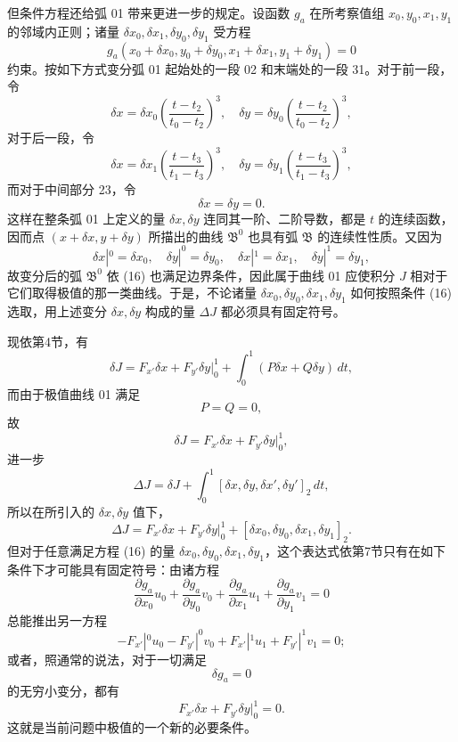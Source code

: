 \documentclass[11pt,a4paper,leqno]{article}
\begin{document}
但条件方程还给弧 01 带来更进一步的规定。设函数 $g_a$ 在所考察值组 $x_0,y_0,x_1,y_1$ 的邻域内正则；诸量 $\delta x_0,\delta x_1,\delta y_0,\delta y_1$ 受方程
\begin{equation}\tag{16}
g_a(x_0+\delta x_0,y_0+\delta y_0,x_1+\delta x_1,y_1+\delta y_1)=0
\end{equation}
约束。按如下方式变分弧 01 起始处的一段 02 和末端处的一段 31。对于前一段，令
\[
\delta x=\delta x_0\left(\frac{t-t_2}{t_0-t_2}\right)^3,
\quad
\delta y=\delta y_0\left(\frac{t-t_2}{t_0-t_2}\right)^3,
\]
对于后一段，令
\[
\delta x=\delta x_1\left(\frac{t-t_3}{t_1-t_3}\right)^3,
\quad
\delta y=\delta y_1\left(\frac{t-t_3}{t_1-t_3}\right)^3,
\]
而对于中间部分 23，令
\[
\delta x=\delta y=0.
\]
这样在整条弧 01 上定义的量 $\delta x,\delta y$ 连同其一阶、二阶导数，都是 $t$ 的连续函数，因而点 $(x+\delta x,y+\delta y)$ 所描出的曲线 $\mathfrak{B}^0$ 也具有弧 $\mathfrak{B}$ 的连续性性质。又因为
\[
\delta x|^0=\delta x_0,\quad \delta y|^0=\delta y_0,\quad
\delta x|^1=\delta x_1,\quad \delta y|^1=\delta y_1,
\]
故变分后的弧 $\mathfrak{B}^0$ 依 (16) 也满足边界条件，因此属于曲线 01 应使积分 $J$ 相对于它们取得极值的那一类曲线。于是，不论诸量 $\delta x_0,\delta y_0,\delta x_1,\delta y_1$ 如何按照条件 (16) 选取，用上述变分 $\delta x,\delta y$ 构成的量 $\Delta J$ 都必须具有固定符号。

现依第4节，有
\[
\delta J=F_{x'}\delta x+F_{y'}\delta y\bigg|_0^1+\int_0^1(P\delta x+Q\delta y)\,dt,
\]
而由于极值曲线 01 满足
\[
P=Q=0,
\]
故
\[
\delta J=F_{x'}\delta x+F_{y'}\delta y\bigg|_0^1,
\]
进一步
\[
\Delta J=\delta J+\int_0^1[\delta x,\delta y,\delta x',\delta y']_2\,dt,
\]
所以在所引入的 $\delta x,\delta y$ 值下，
\[
\Delta J=F_{x'}\delta x+F_{y'}\delta y\bigg|_0^1+[\delta x_0,\delta y_0,\delta x_1,\delta y_1]_2.
\]
但对于任意满足方程 (16) 的量 $\delta x_0,\delta y_0,\delta x_1,\delta y_1$，这个表达式依第7节只有在如下条件下才可能具有固定符号：由诸方程
\[
\frac{\partial g_a}{\partial x_0}u_0+\frac{\partial g_a}{\partial y_0}v_0+\frac{\partial g_a}{\partial x_1}u_1+\frac{\partial g_a}{\partial y_1}v_1=0
\]
总能推出另一方程
\[
-F_{x'}|^0u_0-F_{y'}|^0v_0+F_{x'}|^1u_1+F_{y'}|^1v_1=0;
\]
或者，照通常的说法，对于一切满足
\[
\delta g_a=0
\]
的无穷小变分，都有
\[
F_{x'}\delta x+F_{y'}\delta y\bigg|_0^1=0.
\]
这就是当前问题中极值的一个新的必要条件。
\end{document}
